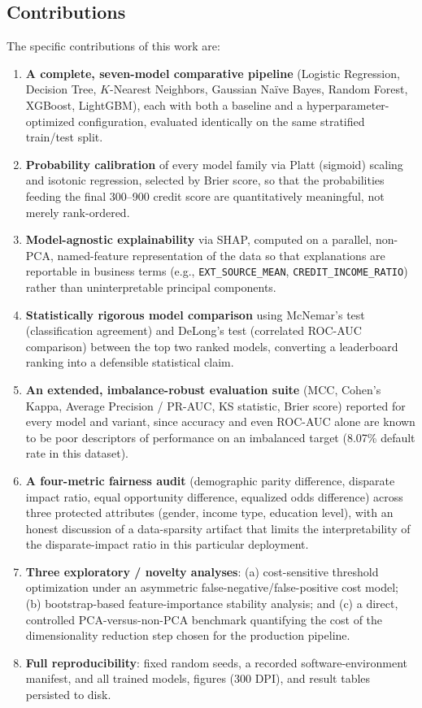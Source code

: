 \documentclass[journal]{IEEEtran}
\begin{document}
\subsection{Contributions}

The specific contributions of this work are:

\begin{enumerate}
\item \textbf{A complete, seven-model comparative pipeline} (Logistic Regression, Decision Tree, $K$-Nearest Neighbors, Gaussian Naïve Bayes, Random Forest, XGBoost, LightGBM), each with both a baseline and a hyperparameter-optimized configuration, evaluated identically on the same stratified train/test split.
\item \textbf{Probability calibration} of every model family via Platt (sigmoid) scaling and isotonic regression, selected by Brier score, so that the probabilities feeding the final 300--900 credit score are quantitatively meaningful, not merely rank-ordered.
\item \textbf{Model-agnostic explainability} via SHAP, computed on a parallel, non-PCA, named-feature representation of the data so that explanations are reportable in business terms (e.g., \texttt{EXT\_SOURCE\_MEAN}, \texttt{CREDIT\_INCOME\_RATIO}) rather than uninterpretable principal components.
\item \textbf{Statistically rigorous model comparison} using McNemar's test (classification agreement) and DeLong's test (correlated ROC-AUC comparison) between the top two ranked models, converting a leaderboard ranking into a defensible statistical claim.
\item \textbf{An extended, imbalance-robust evaluation suite} (MCC, Cohen's Kappa, Average Precision / PR-AUC, KS statistic, Brier score) reported for every model and variant, since accuracy and even ROC-AUC alone are known to be poor descriptors of performance on an imbalanced target (8.07\% default rate in this dataset).
\item \textbf{A four-metric fairness audit} (demographic parity difference, disparate impact ratio, equal opportunity difference, equalized odds difference) across three protected attributes (gender, income type, education level), with an honest discussion of a data-sparsity artifact that limits the interpretability of the disparate-impact ratio in this particular deployment.
\item \textbf{Three exploratory / novelty analyses}: (a) cost-sensitive threshold optimization under an asymmetric false-negative/false-positive cost model; (b) bootstrap-based feature-importance stability analysis; and (c) a direct, controlled PCA-versus-non-PCA benchmark quantifying the cost of the dimensionality reduction step chosen for the production pipeline.
\item \textbf{Full reproducibility}: fixed random seeds, a recorded software-environment manifest, and all trained models, figures (300 DPI), and result tables persisted to disk.
\end{enumerate}
\end{document}
